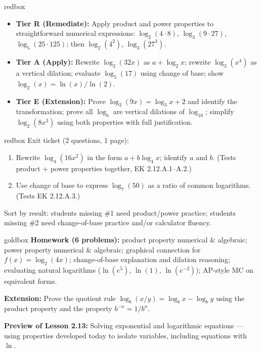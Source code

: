 \documentclass[10pt]{article}
\begin{document}
\begin{skillbox}{redbox}
\begin{itemize}[leftmargin=1.2em,itemsep=2pt,topsep=0pt]
  \item \textbf{Tier R (Remediate):} Apply product and power properties to straightforward
        numerical expressions: $\log_2(4 \cdot 8)$, $\log_3(9 \cdot 27)$, $\log_5(25 \cdot 125)$;
        then $\log_2(4^2)$, $\log_3(27^3)$.
  \item \textbf{Tier A (Apply):} Rewrite $\log_2(32x)$ as $a + \log_2 x$; rewrite $\log_3(x^4)$
        as a vertical dilation; evaluate $\log_5(17)$ using change of base; show
        $\log_2(x) = \ln(x)/\ln(2)$.
  \item \textbf{Tier E (Extension):} Prove $\log_3(9x) = \log_3 x + 2$ and identify the
        transformation; prove all $\log_b$ are vertical dilations of $\log_{10}$; simplify
        $\log_2(8x^3)$ using both properties with full justification.
\end{itemize}
\end{skillbox}

\begin{skillbox}{redbox}
Exit ticket (2 questions, 1 page):
\begin{enumerate}[leftmargin=1.5em,itemsep=2pt,topsep=2pt]
  \item Rewrite $\log_4(16x^2)$ in the form $a + b\log_4 x$; identify $a$ and $b$.
        (Tests product + power properties together, EK 2.12.A.1--A.2.)
  \item Use change of base to express $\log_7(50)$ as a ratio of common logarithms.
        (Tests EK 2.12.A.3.)
\end{enumerate}

Sort by result: students missing \#1 need product/power practice; students missing \#2
need change-of-base practice and/or calculator fluency.
\end{skillbox}

\begin{skillbox}{goldbox}
\textbf{Homework (6 problems):} product property numerical \& algebraic; power property
numerical \& algebraic; graphical connection for $f(x) = \log_2(4x)$; change-of-base
explanation and dilation reasoning; evaluating natural logarithms ($\ln(e^5)$, $\ln(1)$,
$\ln(e^{-2})$); AP-style MC on equivalent forms.

\textbf{Extension:} Prove the quotient rule $\log_b(x/y) = \log_b x - \log_b y$ using the
product property and the property $b^{-n} = 1/b^n$.

\textbf{Preview of Lesson 2.13:} Solving exponential and logarithmic equations --- using
properties developed today to isolate variables, including equations with $\ln$.
\end{skillbox}
\end{document}
